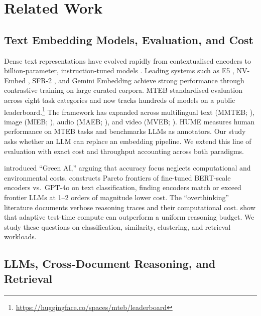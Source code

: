 \section{Related Work}
\label{sec:related}

\subsection{Text Embedding Models, Evaluation, and Cost}

Dense text representations have evolved rapidly from contextualised encoders \citep{devlin2019bert, reimers2019sentencebert} to billion-parameter, instruction-tuned models \citep{su2022instructor}.
Leading systems such as E5 \citep{wang2024textembeddingsweaklysupervisedcontrastive, wang2024improvingtextembeddingslarge}, NV-Embed \citep{lee2024nvembedimprovedtechniques}, SFR-2 \citep{meng2024sfremb2}, and Gemini Embedding \citep{lee2025geminiembedding} achieve strong performance through contrastive training on large curated corpora.
MTEB \citep{muennighoff2023mteb} standardised evaluation across eight task categories and now tracks hundreds of models on a public leaderboard.\footnote{\url{https://huggingface.co/spaces/mteb/leaderboard}}
The framework has expanded across multilingual text (MMTEB; \citealp{enevoldsen2025mmtebmassivemultilingualtext}), image (MIEB; \citealp{xiao2025mieb}), audio (MAEB; \citealp{elassadi2026maeb}), and video (MVEB; \citealp{elassadi2026mveb}).
HUME \citep{assadi2025humemeasuringhumanmodelperformance} measures human performance on MTEB tasks and benchmarks LLMs as annotators. Our study asks whether an LLM can replace an embedding pipeline.
We extend this line of evaluation with exact cost and throughput accounting across both paradigms.

\citet{schwartz2020green} introduced ``Green AI,'' arguing that accuracy focus neglects computational and environmental costs.
\citet{gonzalez2026costaware} constructs Pareto frontiers of fine-tuned BERT-scale encoders vs.\ GPT-4o on text classification, finding encoders match or exceed frontier LLMs at 1--2 orders of magnitude lower cost.
The ``overthinking'' literature \citep{sui2025stopoverthinking} documents verbose reasoning traces and their computational cost. \citet{snell2024scalingllmtesttimecompute} show that adaptive test-time compute can outperform a uniform reasoning budget. We study these questions on classification, similarity, clustering, and retrieval workloads.


\subsection{LLMs, Cross-Document Reasoning, and Retrieval}

